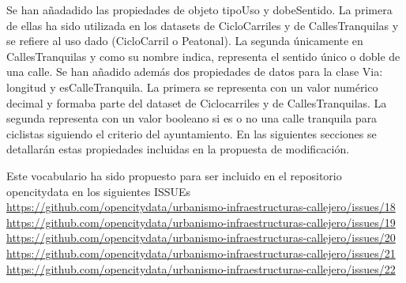 Se han añadadido las propiedades de objeto tipoUso y dobeSentido. La primera de ellas ha sido utilizada en los datasets de CicloCarriles y de CallesTranquilas y se refiere al uso dado (CicloCarril o Peatonal). La segunda únicamente en CallesTranquilas y como su nombre indica, representa el sentido único o doble de una calle.\newline
Se han añadido además dos propiedades de datos para la clase Via: longitud y esCalleTranquila. La primera se representa con un valor numérico decimal y formaba parte del dataset de Ciclocarriles y de CallesTranquilas. La segunda representa con un valor booleano si es o no una calle tranquila para ciclistas siguiendo el criterio del ayuntamiento.\newline
En las siguientes secciones se detallarán estas propiedades incluidas en la propuesta de modificación.

Este vocabulario ha sido propuesto para ser incluido en el repositorio opencitydata en los siguientes ISSUEs 
\url{https://github.com/opencitydata/urbanismo-infraestructuras-callejero/issues/18}
\url{https://github.com/opencitydata/urbanismo-infraestructuras-callejero/issues/19}
\url{https://github.com/opencitydata/urbanismo-infraestructuras-callejero/issues/20}
\url{https://github.com/opencitydata/urbanismo-infraestructuras-callejero/issues/21}
\url{https://github.com/opencitydata/urbanismo-infraestructuras-callejero/issues/22}



